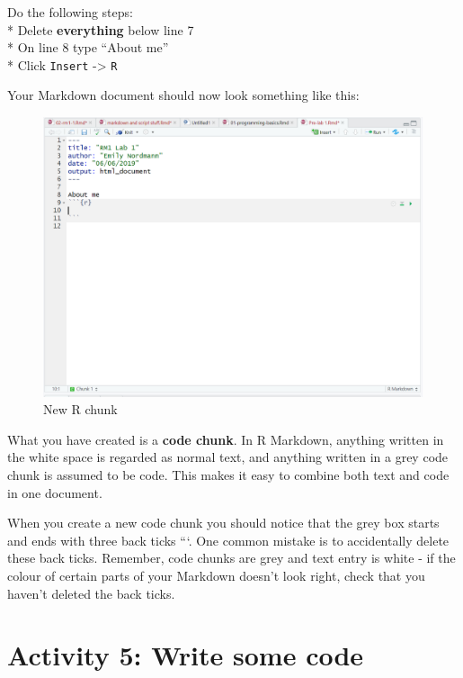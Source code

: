 \documentclass[
  oneside]{book}
\begin{document}
Do the following steps:\\
* Delete \textbf{everything} below line 7\\
* On line 8 type ``About me''\\
* Click \texttt{Insert} -\textgreater{} \texttt{R}

Your Markdown document should now look something like this:

\begin{figure}

{\centering \includegraphics[width=1\linewidth]{images/new-chunk} 

}

\caption{New R chunk}\label{fig:img-new-chunk}
\end{figure}

What you have created is a \textbf{code chunk}. In R Markdown, anything written in the white space is regarded as normal text, and anything written in a grey code chunk is assumed to be code. This makes it easy to combine both text and code in one document.

\begin{warning}
When you create a new code chunk you should notice that the grey box
starts and ends with three back ticks ```. One common mistake is to
accidentally delete these back ticks. Remember, code chunks are grey and
text entry is white - if the colour of certain parts of your Markdown
doesn't look right, check that you haven't deleted the back ticks.
\end{warning}

\hypertarget{activity-5-write-some-code}{%
\section{Activity 5: Write some code}\label{activity-5-write-some-code}}
\end{document}
